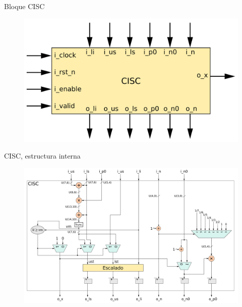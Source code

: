 \documentclass[xcolor=table]{beamer}
\begin{document}
\begin{frame}{Bloque CISC}

 \begin{figure}
  \centering
  \includegraphics[width=0.70\paperwidth]{Diagramas/cisc.png}%
\end{figure}
\end{frame}

\begin{frame}{CISC, estructura interna}

 \begin{figure}
  \centering
  \includegraphics[width=0.70\paperwidth]{Diagramas/internal_cisc.png}%
\end{figure}
\end{frame}
\end{document}
